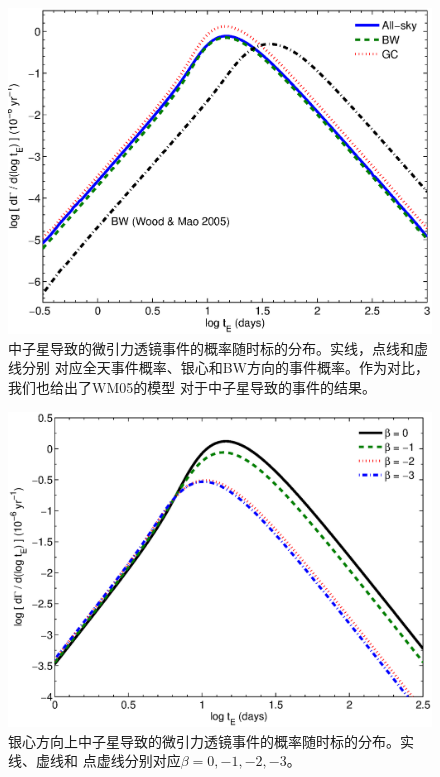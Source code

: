 \begin{figure}
\begin{center}
  \includegraphics[width=4 in,trim=0 0 0 3cm]{timescale.eps}
\caption{中子星导致的微引力透镜事件的概率随时标的分布。实线，点线和虚线分别
对应全天事件概率、银心和BW方向的事件概率。作为对比，我们也给出了WM05的模型
对于中子星导致的事件的结果。}
\label{timescale}
\end{center}
\end{figure}

%
\begin{figure}
\begin{center}
  \includegraphics[width=4 in,trim=0 0 0 3cm]{time_beta.eps}
%
\caption{银心方向上中子星导致的微引力透镜事件的概率随时标的分布。实线、虚线和
点虚线分别对应$\beta=0,-1,-2,-3$。}
\label{timescale_beta}
\end{center}
\end{figure}
%

